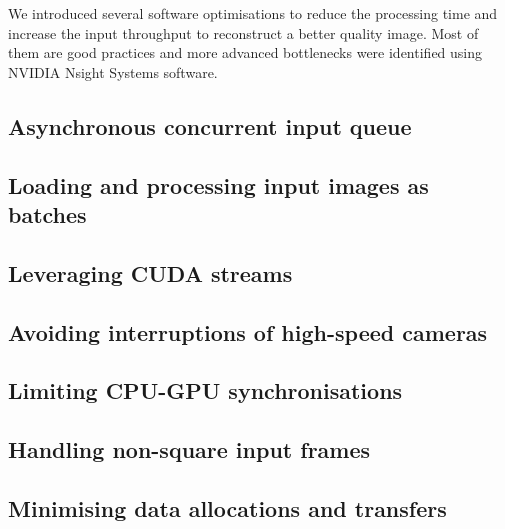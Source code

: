 

We introduced several software optimisations to reduce the processing time and increase the input throughput to reconstruct a better quality image. Most of them are good practices and more advanced bottlenecks were identified using NVIDIA Nsight Systems software.

\subsection{Asynchronous concurrent input queue}


\subsection{Loading and processing input images as batches}


\subsection{Leveraging CUDA streams}


\subsection{Avoiding interruptions of high-speed cameras}


\subsection{Limiting CPU-GPU synchronisations}


\subsection{Handling non-square input frames}


\subsection{Minimising data allocations and transfers}


